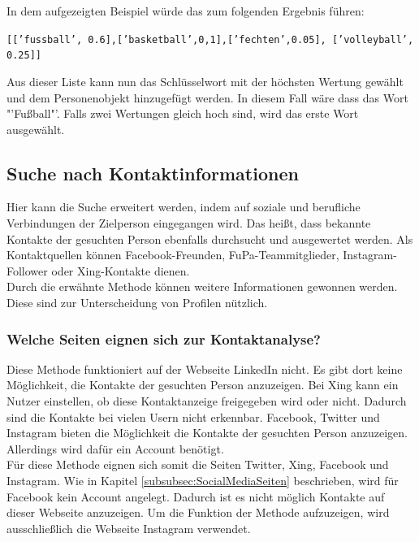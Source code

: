 		In dem aufgezeigten Beispiel würde das zum folgenden Ergebnis führen:
		
		\texttt{[['fussball', 0.6],['basketball',0,1],['fechten',0.05],
			['volleyball', 0.25]]}		
		
		Aus dieser Liste kann nun das Schlüsselwort mit der höchsten Wertung gewählt und dem Personenobjekt hinzugefügt werden. In diesem Fall wäre dass das Wort "'Fußball"'. Falls zwei Wertungen gleich hoch sind, wird das erste Wort ausgewählt.
		
	\subsection{Suche nach Kontaktinformationen}
	\label{subsec:Kontaktanalyse}
	Hier kann die Suche erweitert werden, indem auf soziale und berufliche Verbindungen der Zielperson eingegangen wird. Das heißt, dass bekannte Kontakte der gesuchten Person ebenfalls durchsucht und ausgewertet werden. Als Kontaktquellen können Facebook-Freunden, FuPa-Teammitglieder, Instagram-Follower oder Xing-Kontakte dienen.\\
	Durch die erwähnte Methode können weitere Informationen gewonnen werden. Diese sind zur Unterscheidung von Profilen nützlich.
	
		\subsubsection{Welche Seiten eignen sich zur Kontaktanalyse?}
		Diese Methode funktioniert auf der Webseite LinkedIn nicht. Es gibt dort keine Möglichkeit, die Kontakte der gesuchten Person anzuzeigen. Bei Xing kann ein Nutzer einstellen, ob diese Kontaktanzeige freigegeben wird oder nicht. Dadurch sind die Kontakte bei vielen Usern nicht erkennbar. Facebook, Twitter und Instagram bieten die Möglichkeit die Kontakte der gesuchten Person anzuzeigen. Allerdings wird dafür ein Account benötigt.\\
		Für diese Methode eignen sich somit die Seiten Twitter, Xing, Facebook und Instagram. Wie in Kapitel \ref{subsubsec:SocialMediaSeiten} beschrieben, wird für Facebook kein Account angelegt. Dadurch ist es nicht möglich Kontakte auf dieser Webseite anzuzeigen. Um die Funktion der Methode aufzuzeigen, wird ausschließlich die Webseite Instagram verwendet.
		

